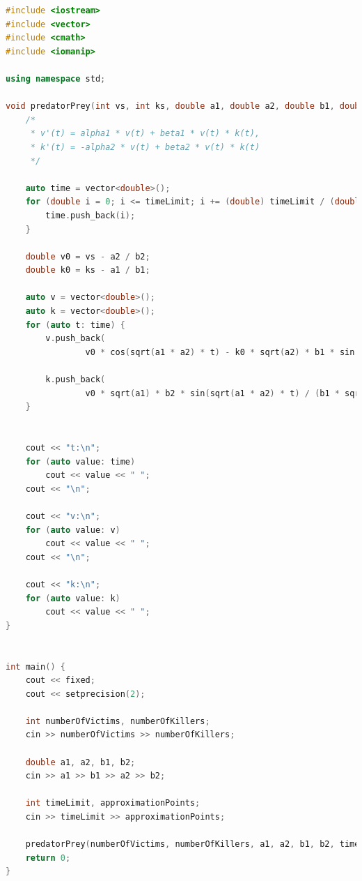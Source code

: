 \documentclass{article}
\begin{document}
\begin{lstlisting}[language=C++]
#include <iostream>
#include <vector>
#include <cmath>
#include <iomanip>

using namespace std;

void predatorPrey(int vs, int ks, double a1, double a2, double b1, double b2, int timeLimit, int approximation) {
    /*
     * v'(t) = alpha1 * v(t) + beta1 * v(t) * k(t),
     * k'(t) = -alpha2 * v(t) + beta2 * v(t) * k(t)
     */

    auto time = vector<double>();
    for (double i = 0; i <= timeLimit; i += (double) timeLimit / (double) approximation) {
        time.push_back(i);
    }

    double v0 = vs - a2 / b2;
    double k0 = ks - a1 / b1;

    auto v = vector<double>();
    auto k = vector<double>();
    for (auto t: time) {
        v.push_back(
                v0 * cos(sqrt(a1 * a2) * t) - k0 * sqrt(a2) * b1 * sin(sqrt(a1 * a2) * t) / (b2 * sqrt(a1)) + a2 / b2);

        k.push_back(
                v0 * sqrt(a1) * b2 * sin(sqrt(a1 * a2) * t) / (b1 * sqrt(a2)) + k0 * cos(sqrt(a1 * a2) * t) + a1 / b1);
    }


    cout << "t:\n";
    for (auto value: time)
        cout << value << " ";
    cout << "\n";

    cout << "v:\n";
    for (auto value: v)
        cout << value << " ";
    cout << "\n";

    cout << "k:\n";
    for (auto value: k)
        cout << value << " ";
}


int main() {
    cout << fixed;
    cout << setprecision(2);

    int numberOfVictims, numberOfKillers;
    cin >> numberOfVictims >> numberOfKillers;

    double a1, a2, b1, b2;
    cin >> a1 >> b1 >> a2 >> b2;

    int timeLimit, approximationPoints;
    cin >> timeLimit >> approximationPoints;

    predatorPrey(numberOfVictims, numberOfKillers, a1, a2, b1, b2, timeLimit, approximationPoints);
    return 0;
}
\end{lstlisting} \\ 
\end{document}
